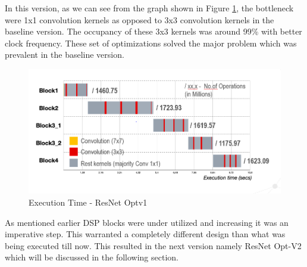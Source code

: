 In this version, as we can see from the graph shown in Figure \ref{fig:ResNet50_optv1_execution}, the bottleneck were 1x1 convolution kernels as opposed to 3x3 convolution kernels in the baseline version. The occupancy of these 3x3 kernels was around 99\% with better clock frequency. These set of optimizations solved the major problem which was prevalent in the baseline version. 

\begin{figure}[!htb]
 \includegraphics[width=\textwidth,height=\textheight,keepaspectratio]{img/resnetv1exe.PNG}
 \caption{Execution Time - ResNet Optv1 }
 \label{fig:ResNet50_optv1_execution}
\end{figure}

As mentioned earlier DSP blocks were under utilized and increasing it was an imperative step. This warranted a completely different design than what was being executed till now. This resulted in the next version namely ResNet Opt-V2 which will be discussed in the following section.



